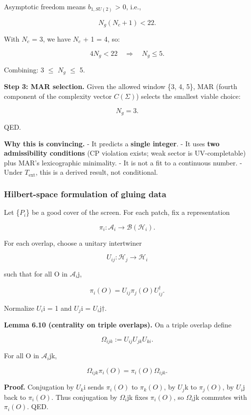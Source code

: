 \documentclass[11pt,a4paper]{article}
\theoremstyle{remark}
\begin{document}
Asymptotic freedom means \(b_{1,SU(2)}\) \textgreater{} 0, i.e.,

\[
N_g(N_c + 1) < 22.
\]

With \(N_c\) = 3, we have \(N_c\) + 1 = 4, so:

\[
4 N_g < 22 \quad \Rightarrow \quad N_g \le 5.
\]

Combining: 3 \ensuremath{\leq} \(N_g\) \ensuremath{\leq} 5.

\textbf{Step 3: MAR selection.} Given the allowed window \{3, 4, 5\}, MAR
(fourth component of the complexity vector \(C(\Sigma)\)) selects the
smallest viable choice:

\[
N_g = 3.
\]

QED.

\textbf{Why this is convincing.}
- It predicts a \textbf{single integer}.
- It uses \textbf{two admissibility conditions} (CP violation exists; weak
sector is UV-completable) plus MAR's lexicographic minimality.
- It is not a fit to a continuous number.
- Under \(T_{\mathrm{ext}}\), this is a derived result, not conditional.

\subsubsection{Hilbert-space formulation of gluing data}\label{hilbert-space-formulation-of-gluing-data}

Let \{\(P_i\)\} be a good cover of the screen. For each patch, fix a representation

\[
\pi_i: \mathcal{A}_i \to \mathcal B(\mathcal H_i).
\]

For each overlap, choose a unitary intertwiner

\[
U_{ij}: \mathcal H_j \to \mathcal H_i
\]

such that for all O in \(\ensuremath{\mathcal{A}}_i\)j,

\[
\pi_i(O) = U_{ij} \pi_j(O) U_{ij}^\dagger.
\]

Normalize \(U_i\)i = 1 and \(U_j\)i = \(U_i\)j\ensuremath{\dagger}.

\textbf{Lemma 6.10 (centrality on triple overlaps).} On a triple overlap define

\[
\Omega_{ijk} := U_{ij} U_{jk} U_{ki}.
\]

For all O in \(\ensuremath{\mathcal{A}}_i\)jk,

\[
\Omega_{ijk} \pi_i(O) = \pi_i(O) \Omega_{ijk}.
\]

\textbf{Proof.} Conjugation by \(U_k\)i sends \(\ensuremath{\pi}_i(O)\) to \(\ensuremath{\pi}_k(O)\), by \(U_j\)k to \(\ensuremath{\pi}_j(O)\),
by \(U_i\)j back to \(\ensuremath{\pi}_i(O)\). Thus conjugation by \(\ensuremath{\Omega}_i\)jk fixes \(\ensuremath{\pi}_i(O)\), so
\(\ensuremath{\Omega}_i\)jk commutes with \(\ensuremath{\pi}_i(O)\). QED.
\end{document}

